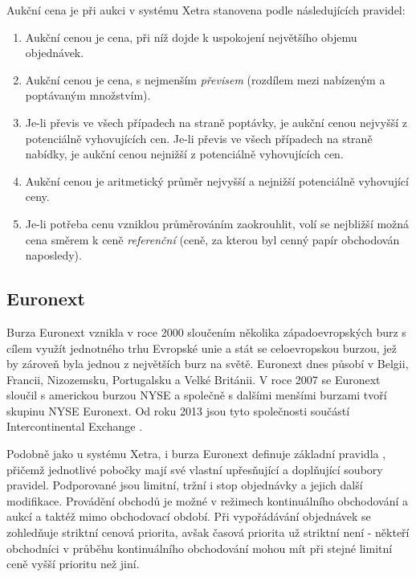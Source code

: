 \documentclass[thesis=M,czech]{FITthesis}[2012/06/26]
\begin{document}
Aukční cena je při aukci v systému Xetra stanovena podle následujících pravidel:

\begin{enumerate}
	\item Aukční cenou je cena, při níž dojde k uspokojení největšího objemu objednávek.
	\item Aukční cenou je cena, s nejmenším \textit{převisem} (rozdílem mezi nabízeným a poptávaným množstvím).
	\item Je-li převis ve všech případech na straně poptávky, je aukční cenou nejvyšší z potenciálně vyhovujících cen. 
		Je-li převis ve všech případech na straně nabídky, je aukční cenou nejnižší z potenciálně vyhovujících cen. 
	\item Aukční cenou je aritmetický průměr nejvyšší a nejnižší potenciálně vyhovující ceny.
	\item Je-li potřeba cenu vzniklou průměrováním zaokrouhlit, volí se nejbližší možná cena směrem k ceně 
		\textit{referenční} (ceně, za kterou byl cenný papír obchodován naposledy).
\end{enumerate}


\subsection{Euronext}

Burza Euronext \cite{euronext} vznikla v roce 2000 sloučením několika západoevropských burz s cílem využít jednotného 
trhu Evropské unie a stát se celoevropskou burzou, jež by zároveň byla jednou z největších burz na světě. Euronext 
dnes působí v Belgii, Francii, Nizozemsku, Portugalsku a Velké Británii. V roce 2007 se Euronext sloučil s americkou burzou 
NYSE a společně s dalšími menšími burzami tvoří skupinu NYSE Euronext. Od roku 2013 jsou tyto společnosti součástí 
Intercontinental Exchange \cite{ice}. 

Podobně jako u systému Xetra, i burza Euronext definuje základní pravidla \cite{euronextrules}, přičemž jednotlivé 
pobočky mají své vlastní upřesňující a doplňující soubory pravidel. Podporované jsou limitní, tržní i stop objednávky a 
jejich další modifikace. Provádění obchodů je možné v režimech kontinuálního obchodování a aukcí a taktéž mimo
obchodovací období. Při vypořádávání objednávek se zohledňuje striktní cenová priorita, avšak časová priorita už 
striktní není - někteří obchodníci v průběhu kontinuálního obchodování mohou mít při stejné limitní ceně vyšší prioritu 
než jiní.
\end{document}
